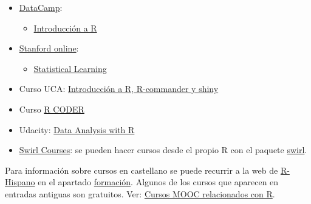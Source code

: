\documentclass[
]{book}
\providecommand{\tightlist}{%
  \setlength{\itemsep}{0pt}\setlength{\parskip}{0pt}}
\theoremstyle{break}
\theoremstyle{definition}
\theoremstyle{definition}
\theoremstyle{definition}
\theoremstyle{remark}
\begin{document}
\begin{itemize}
\item
  \href{https://www.datacamp.com/courses}{DataCamp}:

  \begin{itemize}
  \tightlist
  \item
    \href{https://www.datacamp.com/courses/introduccion-a-r/}{Introducción a R}
  \end{itemize}
\end{itemize}

\begin{itemize}
\item
  \href{http://online.stanford.edu/courses}{Stanford online}:

  \begin{itemize}
  \tightlist
  \item
    \href{http://online.stanford.edu/course/statistical-learning}{Statistical Learning}
  \end{itemize}
\end{itemize}

\begin{itemize}
\tightlist
\item
  Curso UCA: \href{http://knuth.uca.es/moodle/course/view.php?id=51}{Introducción a R, R-commander y shiny}
\end{itemize}

\begin{itemize}
\tightlist
\item
  Curso \href{https://r-coder.com/curso-r}{R CODER}
\end{itemize}

\begin{itemize}
\tightlist
\item
  Udacity: \href{https://eu.udacity.com/course/data-analysis-with-r--ud651}{Data Analysis with R}
\end{itemize}

\begin{itemize}
\tightlist
\item
  \href{https://swirlstats.com/scn/title.html}{Swirl Courses}:
  se pueden hacer cursos desde el propio R con el paquete
  \href{https://swirlstats.com}{swirl}.
\end{itemize}

Para información sobre cursos en castellano se puede recurrir a la web de \href{http://r-es.org/}{R-Hispano} en el apartado \href{http://r-es.org/category/formacion}{formación}. Algunos de los cursos que aparecen en entradas antiguas son gratuitos.
Ver: \href{http://r-es.org/2016/02/12/cursos-masivos-y-otra-formacion-on-line-sobre-r/}{Cursos MOOC relacionados con R}.
\end{document}
